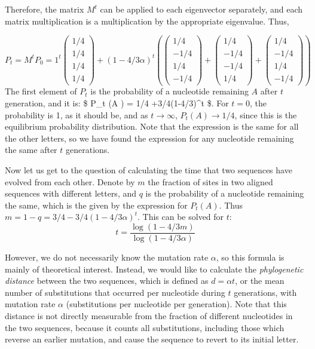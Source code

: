 \documentclass[
  letterpaper,
  DIV=11,
  numbers=noendperiod]{scrreprt}
\begin{document}
Therefore, the matrix \(M^t\) can be applied to each eigenvector
separately, and each matrix multiplication is a multiplication by the
appropriate eigenvalue. Thus,

\[ 
P_t = M^t P_0 =   1^t \left(\begin{array}{c} 1/4 \\ 1/4 \\ 1/4 \\ 1/4 \end{array}\right) + (1-4/3\alpha)^t\left( \left(\begin{array}{c} 1/4 \\ -1/4 \\ 1/4 \\ -1/4 \end{array}\right) +  \left(\begin{array}{c} 1/4 \\ -1/4 \\ -1/4 \\ 1/4 \end{array}\right) + \left(\begin{array}{c} 1/4 \\ -1/4 \\ 1/4 \\ -1/4 \end{array}\right) \right)
\] The first element of \(P_t\) is the probability of a nucleotide
remaining \(A\) after \(t\) generation, and it is: \$ P\_t (A ) = 1/4
+3/4(1-4/3\alpha)\^{}t \$. For \(t=0\), the probability is 1, as it
should be, and as \(t \rightarrow \infty\), \(P_t (A) \rightarrow 1/4\),
since this is the equilibrium probability distribution. Note that the
expression is the same for all the other letters, so we have found the
expression for any nucleotide remaining the same after \(t\)
generations.

Now let us get to the question of calculating the time that two
sequences have evolved from each other. Denote by \(m\) the fraction of
sites in two aligned sequences with different letters, and \(q\) is the
probability of a nucleotide remaining the same, which is the given by
the expression for \(P_t(A)\). Thus
\(m = 1 - q = 3/4 - 3/4(1-4/3\alpha)^t\). This can be solved for \(t\):
\[ 
t = \frac{\log (1 - 4/3 m)}{\log (1 -4/3 \alpha)}
\]

However, we do not necessarily know the mutation rate \(\alpha\), so
this formula is mainly of theoretical interest. Instead, we would like
to calculate the \emph{phylogenetic distance} between the two sequences,
which is defined as \(d = \alpha t\), or the mean number of
substitutions that occurred per nucleotide during \(t\) generations,
with mutation rate \(\alpha\) (substitutions per nucleotide per
generation). Note that this distance is not directly measurable from the
fraction of different nucleotides in the two sequences, because it
counts all substitutions, including those which reverse an earlier
mutation, and cause the sequence to revert to its initial letter.
\end{document}
